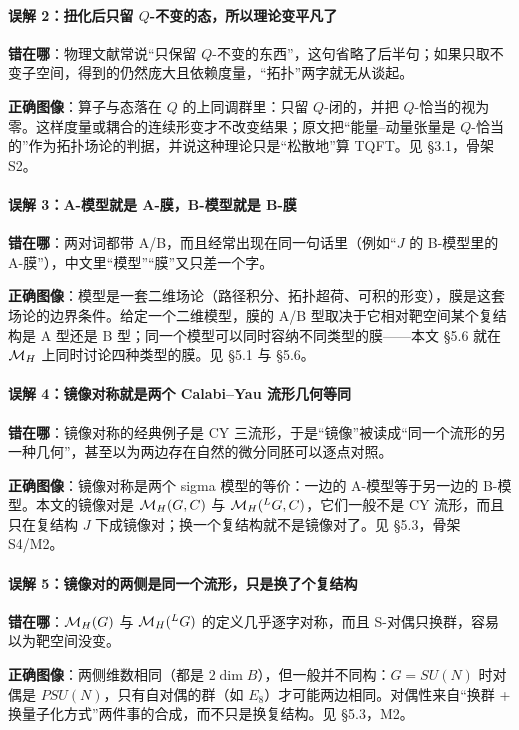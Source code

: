 \paragraph{误解 2：扭化后只留 $Q$-不变的态，所以理论变平凡了}
\mbox{}\par\noindent
\textbf{错在哪}：物理文献常说“只保留 $Q$-不变的东西”，这句省略了后半句；如果只取不变子空间，得到的仍然庞大且依赖度量，“拓扑”两字就无从谈起。
\par\noindent
\textbf{正确图像}：算子与态落在 $Q$ 的上同调群里：只留 $Q$-闭的，并把 $Q$-恰当的视为零。这样度量或耦合的连续形变才不改变结果；原文把“能量--动量张量是 $Q$-恰当的”作为拓扑场论的判据，并说这种理论只是“松散地”算 TQFT。见 \S3.1，骨架 S2。

\paragraph{误解 3：A-模型就是 A-膜，B-模型就是 B-膜}
\mbox{}\par\noindent
\textbf{错在哪}：两对词都带 A/B，而且经常出现在同一句话里（例如“$J$ 的 B-模型里的 A-膜”），中文里“模型”“膜”又只差一个字。
\par\noindent
\textbf{正确图像}：模型是一套二维场论（路径积分、拓扑超荷、可积的形变），膜是这套场论的边界条件。给定一个二维模型，膜的 A/B 型取决于它相对靶空间某个复结构是 A 型还是 B 型；同一个模型可以同时容纳不同类型的膜——本文 \S5.6 就在 $\mathcal{M}_H$ 上同时讨论四种类型的膜。见 \S5.1 与 \S5.6。

\paragraph{误解 4：镜像对称就是两个 Calabi--Yau 流形几何等同}
\mbox{}\par\noindent
\textbf{错在哪}：镜像对称的经典例子是 CY 三流形，于是“镜像”被读成“同一个流形的另一种几何”，甚至以为两边存在自然的微分同胚可以逐点对照。
\par\noindent
\textbf{正确图像}：镜像对称是两个 sigma 模型的等价：一边的 A-模型等于另一边的 B-模型。本文的镜像对是 $\mathcal{M}_H(G,C)$ 与 $\mathcal{M}_H({}^{L}G,C)$，它们一般不是 CY 流形，而且只在复结构 $J$ 下成镜像对；换一个复结构就不是镜像对了。见 \S5.3，骨架 S4/M2。

\paragraph{误解 5：镜像对的两侧是同一个流形，只是换了个复结构}
\mbox{}\par\noindent
\textbf{错在哪}：$\mathcal{M}_H(G)$ 与 $\mathcal{M}_H({}^{L}G)$ 的定义几乎逐字对称，而且 S-对偶只换群，容易以为靶空间没变。
\par\noindent
\textbf{正确图像}：两侧维数相同（都是 $2\dim B$），但一般并不同构：$G=SU(N)$ 时对偶是 $PSU(N)$，只有自对偶的群（如 $E_8$）才可能两边相同。对偶性来自“换群 + 换量子化方式”两件事的合成，而不只是换复结构。见 \S5.3，M2。

